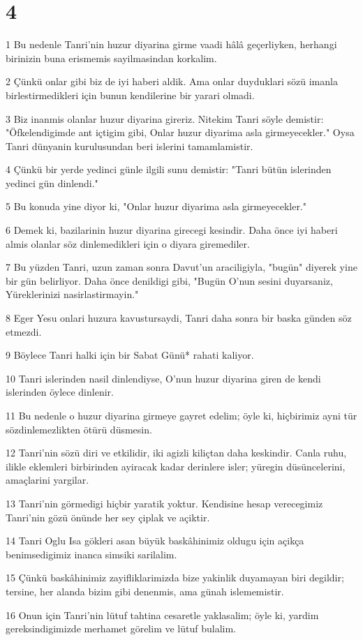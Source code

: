 \chapter{4}

\par 1 Bu nedenle Tanri'nin huzur diyarina girme vaadi hâlâ geçerliyken, herhangi birinizin buna erismemis sayilmasindan korkalim.
\par 2 Çünkü onlar gibi biz de iyi haberi aldik. Ama onlar duyduklari sözü imanla birlestirmedikleri için bunun kendilerine bir yarari olmadi.
\par 3 Biz inanmis olanlar huzur diyarina gireriz. Nitekim Tanri söyle demistir: "Öfkelendigimde ant içtigim gibi, Onlar huzur diyarima asla girmeyecekler." Oysa Tanri dünyanin kurulusundan beri islerini tamamlamistir.
\par 4 Çünkü bir yerde yedinci günle ilgili sunu demistir: "Tanri bütün islerinden yedinci gün dinlendi."
\par 5 Bu konuda yine diyor ki, "Onlar huzur diyarima asla girmeyecekler."
\par 6 Demek ki, bazilarinin huzur diyarina girecegi kesindir. Daha önce iyi haberi almis olanlar söz dinlemedikleri için o diyara giremediler.
\par 7 Bu yüzden Tanri, uzun zaman sonra Davut'un araciligiyla, "bugün" diyerek yine bir gün belirliyor. Daha önce denildigi gibi, "Bugün O'nun sesini duyarsaniz, Yüreklerinizi nasirlastirmayin."
\par 8 Eger Yesu onlari huzura kavustursaydi, Tanri daha sonra bir baska günden söz etmezdi.
\par 9 Böylece Tanri halki için bir Sabat Günü* rahati kaliyor.
\par 10 Tanri islerinden nasil dinlendiyse, O'nun huzur diyarina giren de kendi islerinden öylece dinlenir.
\par 11 Bu nedenle o huzur diyarina girmeye gayret edelim; öyle ki, hiçbirimiz ayni tür sözdinlemezlikten ötürü düsmesin.
\par 12 Tanri'nin sözü diri ve etkilidir, iki agizli kiliçtan daha keskindir. Canla ruhu, ilikle eklemleri birbirinden ayiracak kadar derinlere isler; yüregin düsüncelerini, amaçlarini yargilar.
\par 13 Tanri'nin görmedigi hiçbir yaratik yoktur. Kendisine hesap verecegimiz Tanri'nin gözü önünde her sey çiplak ve açiktir.
\par 14 Tanri Oglu Isa gökleri asan büyük baskâhinimiz oldugu için açikça benimsedigimiz inanca simsiki sarilalim.
\par 15 Çünkü baskâhinimiz zayifliklarimizda bize yakinlik duyamayan biri degildir; tersine, her alanda bizim gibi denenmis, ama günah islememistir.
\par 16 Onun için Tanri'nin lütuf tahtina cesaretle yaklasalim; öyle ki, yardim gereksindigimizde merhamet görelim ve lütuf bulalim.

